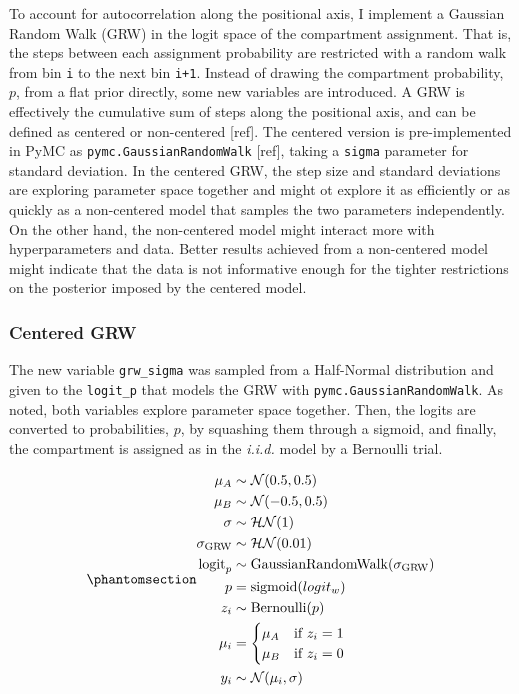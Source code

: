 \documentclass[
  10pt,
  a4paper,
  openany]{scrbook}
\begin{document}
To account for autocorrelation along the positional axis, I implement a
Gaussian Random Walk (GRW) in the logit space of the compartment
assignment. That is, the steps between each assignment probability are
restricted with a random walk from bin \texttt{i} to the next bin
\texttt{i+1}. Instead of drawing the compartment probability, \(p\),
from a flat prior directly, some new variables are introduced. A GRW is
effectively the cumulative sum of steps along the positional axis, and
can be defined as centered or non-centered {[}ref{]}. The centered
version is pre-implemented in PyMC as \texttt{pymc.GaussianRandomWalk}
{[}ref{]}, taking a \texttt{sigma} parameter for standard deviation. In
the centered GRW, the step size and standard deviations are exploring
parameter space together and might ot explore it as efficiently or as
quickly as a non-centered model that samples the two parameters
independently. On the other hand, the non-centered model might interact
more with hyperparameters and data. Better results achieved from a
non-centered model might indicate that the data is not informative
enough for the tighter restrictions on the posterior imposed by the
centered model.

\subsubsection{Centered GRW}\label{centered-grw}

The new variable \texttt{grw\_sigma} was sampled from a Half-Normal
distribution and given to the \texttt{logit\_p} that models the GRW with
\texttt{pymc.GaussianRandomWalk}. As noted, both variables explore
parameter space together. Then, the logits are converted to
probabilities, \(p\), by squashing them through a sigmoid, and finally,
the compartment is assigned as in the \emph{i.i.d.} model by a Bernoulli
trial.

\begin{equation}\phantomsection\label{eq-centered-grw}{
\begin{aligned}
\mu_A &\sim \mathcal{N}(0.5, 0.5) \\
\mu_B &\sim \mathcal{N}(-0.5, 0.5) \\
\sigma &\sim \mathcal{HN}(1) \\
\sigma_{\mathrm{GRW}} &\sim \mathcal{HN}(0.01)\\
\mathrm{logit}_p &\sim \operatorname{GaussianRandomWalk}(\sigma_{\mathrm{GRW}}) \\
p &= \operatorname{sigmoid}(logit_w) \\
z_i &\sim \text{Bernoulli}(p) \\
\mu_i &= 
\begin{cases}
\mu_A & \text{if } z_i = 1 \\
\mu_B & \text{if } z_i = 0
\end{cases} \\
y_i &\sim \mathcal{N}(\mu_i, \sigma) \\
\end{aligned}
}\end{equation}
\end{document}

